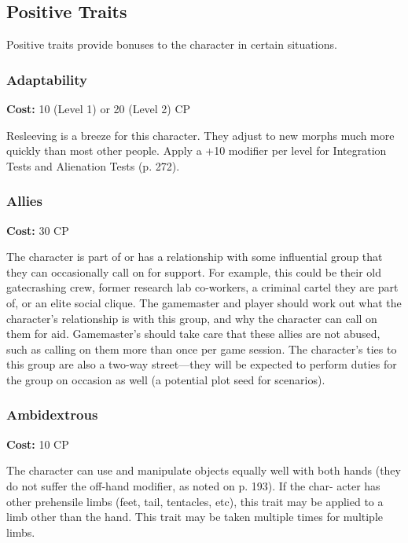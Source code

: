 \subsection{Positive Traits}

Positive traits provide bonuses to the character in 
certain situations.

\subsubsection{Adaptability}

\textbf{Cost:} 10 (Level 1) or 20 (Level 2) CP

Resleeving is a breeze for this character. They adjust 
to new morphs much more quickly than most other 
people. Apply a +10 modifier per level for Integration 
Tests and Alienation Tests (p. 272).

\subsubsection{Allies}

\textbf{Cost:} 30 CP

The character is part of or has a relationship with 
some influential group that they can occasionally call 
on for support. For example, this could be their old 
gatecrashing crew, former research lab co-workers, 
a criminal cartel they are part of, or an elite social 
clique. The gamemaster and player should work out 
what the character's relationship is with this group, 
and why the character can call on them for aid. 
Gamemaster's should take care that these allies are 
not abused, such as calling on them more than once 
per game session. The character's ties to this group 
are also a two-way street—they will be expected to 
perform duties for the group on occasion as well (a 
potential plot seed for scenarios).

\subsubsection{Ambidextrous}

\textbf{Cost:} 10 CP

The character can use and manipulate objects 
equally well with both hands (they do not suffer the 
off-hand modifier, as noted on p. 193). If the char-
acter has other prehensile limbs (feet, tail, tentacles, 
etc), this trait may be applied to a limb other than 
the hand. This trait may be taken multiple times for 
multiple limbs.

